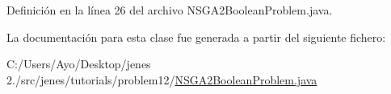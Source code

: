 Definición en la línea 26 del archivo N\-S\-G\-A2\-Boolean\-Problem.\-java.



La documentación para esta clase fue generada a partir del siguiente fichero\-:\begin{DoxyCompactItemize}
\item 
C\-:/\-Users/\-Ayo/\-Desktop/jenes 2./src/jenes/tutorials/problem12/\hyperlink{_n_s_g_a2_boolean_problem_8java}{N\-S\-G\-A2\-Boolean\-Problem.\-java}\end{DoxyCompactItemize}
